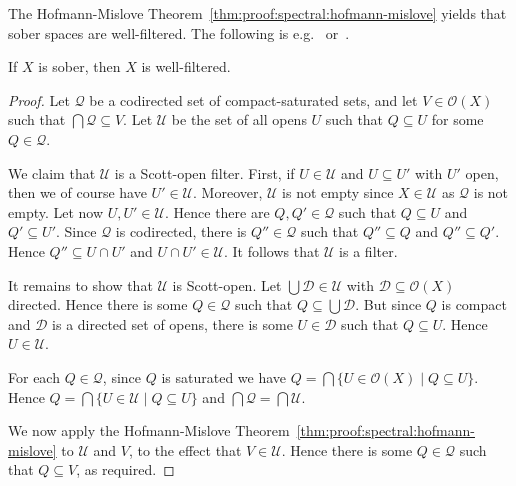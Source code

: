 \documentclass[%
  a4paper,
  UKenglish,
  cleveref,
  autoref,
  thm-restate,
  numberwithinsect,
]{lipics-v2021}
\newcommand\sle\subseteq
\newcommand\Open{\mathcal{O}}		%
\begin{document}
The Hofmann-Mislove Theorem~\ref{thm:proof:spectral:hofmann-mislove}
yields that sober spaces are well-filtered.
The following is e.g.~\cite[Proposition 8.3.5]{goubault13book}
or~\cite[Corollary 7.2.11]{aj95chapter}.

\begin{proposition}
\label{prop:proof:spectral:wf}
If $X$ is sober, then $X$ is well-filtered.
\end{proposition}

\begin{proof}
Let $\mathcal{Q}$ be a codirected set of compact-saturated sets,
and let $V \in \Open(X)$ such that $\bigcap \mathcal{Q} \sle V$.
%
Let $\mathcal{U}$ be the set of all opens $U$ such that
$Q \sle U$ for some $Q \in \mathcal{Q}$.

We claim that $\mathcal{U}$ is a Scott-open filter.
First, if $U \in \mathcal{U}$ and $U \sle U'$ with $U'$ open,
then we of course have $U' \in \mathcal{U}$.
Moreover, $\mathcal{U}$ is not empty since $X \in \mathcal{U}$ 
as $\mathcal{Q}$ is not empty.
Let now $U, U' \in \mathcal{U}$.
Hence there are $Q, Q' \in \mathcal{Q}$ such that $Q \sle U$ and $Q' \sle U'$.
Since $\mathcal{Q}$ is codirected,
there is $Q'' \in \mathcal{Q}$ such that $Q'' \sle Q$ and $Q'' \sle Q'$.
Hence $Q'' \sle U \cap U'$ and $U \cap U' \in \mathcal{U}$.
It follows that $\mathcal{U}$ is a filter.

It remains to show that $\mathcal{U}$ is Scott-open.
Let $\bigcup \mathcal{D} \in \mathcal{U}$
with $\mathcal{D} \sle \Open(X)$ directed.
Hence there is some $Q \in \mathcal{Q}$ such that
$Q \sle \bigcup \mathcal{D}$.
But since $Q$ is compact and $\mathcal{D}$ is a directed set of opens,
there is some $U \in \mathcal{D}$ such that $Q \sle U$.
Hence $U \in \mathcal{U}$.

For each $Q \in \mathcal{Q}$, since $Q$ is saturated
we have $Q = \bigcap \{U \in \Open(X) \mid Q \sle U\}$.
Hence $Q = \bigcap \{U \in \mathcal{U} \mid Q \sle U\}$
and $\bigcap \mathcal{Q} = \bigcap \mathcal{U}$.

We now apply the Hofmann-Mislove Theorem~\ref{thm:proof:spectral:hofmann-mislove}
to $\mathcal{U}$ and $V$,
to the effect that $V \in \mathcal{U}$.
Hence there is some $Q \in \mathcal{Q}$ such that $Q \sle V$,
as required.
\end{proof}
\end{document}
